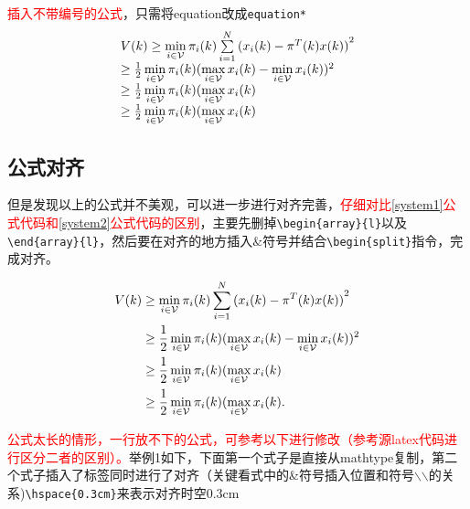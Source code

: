 \documentclass[master]{hdu-thesis}
\begin{document}
\textcolor{red}{插入不带编号的公式}，只需将equation改成\verb+equation*+
\begin{equation*}
  \begin{array}{l}
V(k) \ge \mathop {\min }\limits_{i \in {\cal V}} {\pi _i}(k)\sum\limits_{i = 1}^N {{{({x_i}(k) - {\pi ^T}(k)x(k))}^2}} \\
 \ge \frac{1}{2}\mathop {\min }\limits_{i \in {\cal V}} {\pi _i}(k){(\mathop {\max }\limits_{i \in {\cal V}} {x_i}(k) - \mathop {\min }\limits_{i \in {\cal V}} {x_i}(k))^2}\\
 \ge \frac{1}{2}\mathop {\min }\limits_{i \in {\cal V}} {\pi _i}(k)(\mathop {\max }\limits_{i \in {\cal V}} {x_i}(k)\\
 \ge \frac{1}{2}\mathop {\min }\limits_{i \in {\cal V}} {\pi _i}(k)(\mathop {\max }\limits_{i \in {\cal V}} {x_i}(k)
\end{array}
\end{equation*}


\subsection{公式对齐}

但是发现以上的公式并不美观，可以进一步进行对齐完善，\textcolor{red}{仔细对比\eqref{system1}公式代码和\eqref{system2}公式代码的区别}，主要先删掉\verb+\begin{array}{l}+以及\verb+\end{array}{l}+，然后要在对齐的地方插入$\&$符号并结合\verb+\begin{split}+指令，完成对齐。

\begin{equation}\label{system2}
\begin{split}
V(k) &\ge \mathop {\min }\limits_{i \in {\cal V}} {\pi _i}(k)\sum\limits_{i = 1}^N {{{({x_i}(k) - {\pi ^T}(k)x(k))}^2}} \\
 &\ge \frac{1}{2}\mathop {\min }\limits_{i \in {\cal V}} {\pi _i}(k){(\mathop {\max }\limits_{i \in {\cal V}} {x_i}(k) - \mathop {\min }\limits_{i \in {\cal V}} {x_i}(k))^2}\\
 &\ge \frac{1}{2}\mathop {\min }\limits_{i \in {\cal V}} {\pi _i}(k)(\mathop {\max }\limits_{i \in {\cal V}} {x_i}(k)\\
 &\ge \frac{1}{2}\mathop {\min }\limits_{i \in {\cal V}} {\pi _i}(k)(\mathop {\max }\limits_{i \in {\cal V}} {x_i}(k).
\end{split}
\end{equation}

\textcolor{red}{公式太长的情形，一行放不下的公式，可参考以下进行修改（参考源latex代码进行区分二者的区别）。}举例1如下，下面第一个式子是直接从mathtype复制，第二个式子插入了标签同时进行了对齐（关键看式中的\&符号插入位置和符号$\backslash$$\backslash$的关系)\verb+\hspace{0.3cm}+来表示对齐时空0.3cm
\end{document}
